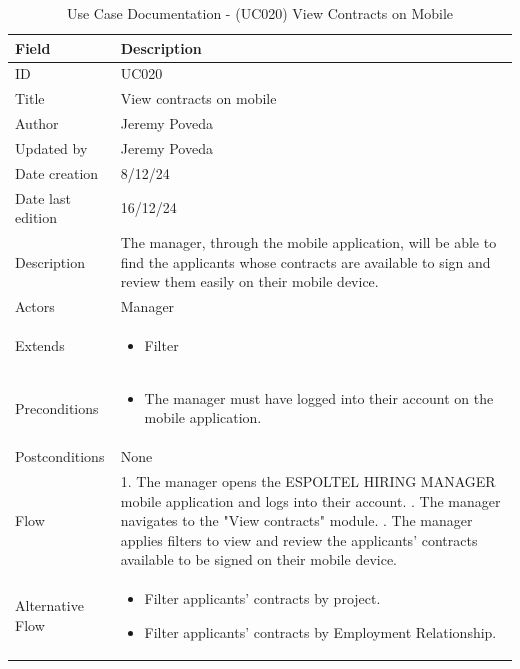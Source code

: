 \documentclass{scrreprt}
\begin{document}
\begin{table}[H]
	\centering
	\begin{tabular}{|p{3cm}|p{10cm}|}
		\hline
		\textbf{Field} & \textbf{Description} \\ \hline
		ID & UC020 \\ \hline
		Title & View contracts on mobile \\ \hline
		Author & Jeremy Poveda \\ \hline
		Updated by & Jeremy Poveda \\ \hline
		Date creation & 8/12/24 \\ \hline
		Date last edition & 16/12/24 \\ \hline
		Description & 
		The manager, through the mobile application, will be able to find the applicants whose contracts are available to sign and review them easily on their mobile device. \\ \hline
		Actors & Manager \\ \hline
		Extends & 
		\begin{itemize}
			\item Filter
		\end{itemize} \\ \hline
		Preconditions & 
		\begin{itemize}
			\item The manager must have logged into their account on the mobile application.
		\end{itemize} \\ \hline
		Postconditions & 
		None \\ \hline
		Flow & 
		1. The manager opens the ESPOLTEL HIRING MANAGER mobile application and logs into their account. \newline
		2. The manager navigates to the "View contracts" module. \newline
		3. The manager applies filters to view and review the applicants' contracts available to be signed on their mobile device. \\ \hline
		Alternative Flow & 
		\begin{itemize}
			\item Filter applicants' contracts by project.
			\item Filter applicants' contracts by Employment Relationship.
		\end{itemize} \\ \hline
	\end{tabular}
	\caption{Use Case Documentation - (UC020) View Contracts on Mobile}
	\label{table:UC020}
\end{table}
\end{document}
